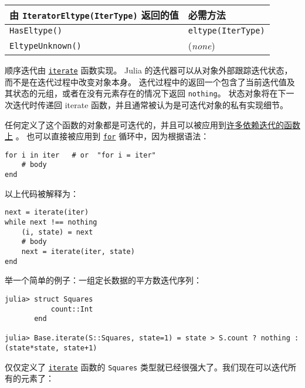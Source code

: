 \begin{table}[h]

\begin{tabulary}{\linewidth}{|L|L|}
\hline
由 \texttt{IteratorEltype(IterType)} 返回的值 & 必需方法 \\
\hline
\texttt{HasEltype()} & \texttt{eltype(IterType)} \\
\hline
\texttt{EltypeUnknown()} & (\emph{none}) \\
\hline
\end{tabulary}

\end{table}



顺序迭代由 \hyperlink{1722534687975587846}{\texttt{iterate}} 函数实现。 Julia 的迭代器可以从对象外部跟踪迭代状态，而不是在迭代过程中改变对象本身。 迭代过程中的返回一个包含了当前迭代值及其状态的元组，或者在没有元素存在的情况下返回 \texttt{nothing}。 状态对象将在下一次迭代时传递回 iterate 函数，并且通常被认为是可迭代对象的私有实现细节。



任何定义了这个函数的对象都是可迭代的，并且可以被应用到\hyperlink{16454089156260356769}{许多依赖迭代的函数上} 。 也可以直接被应用到  \hyperlink{9105224580875818383}{\texttt{for}} 循环中，因为根据语法：




\begin{verbatim}
for i in iter   # or  "for i = iter"
    # body
end
\end{verbatim}



以上代码被解释为：




\begin{verbatim}
next = iterate(iter)
while next !== nothing
    (i, state) = next
    # body
    next = iterate(iter, state)
end
\end{verbatim}



举一个简单的例子：一组定长数据的平方数迭代序列：




\begin{verbatim}
julia> struct Squares
           count::Int
       end

julia> Base.iterate(S::Squares, state=1) = state > S.count ? nothing : (state*state, state+1)
\end{verbatim}



仅仅定义了 \hyperlink{1722534687975587846}{\texttt{iterate}} 函数的 \texttt{Squares} 类型就已经很强大了。我们现在可以迭代所有的元素了：




